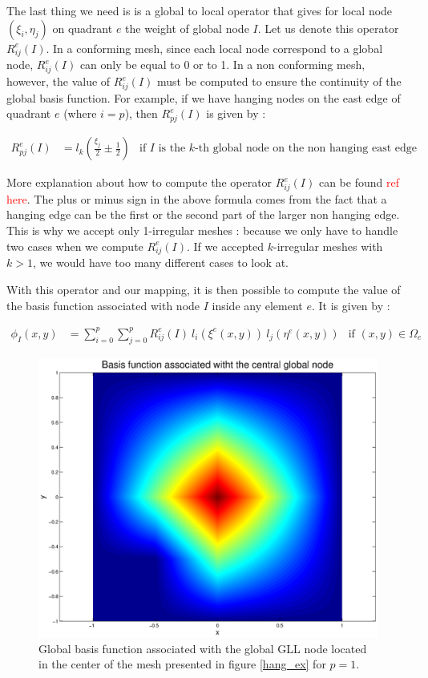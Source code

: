 The last thing we need is is a global to local operator that gives for local node $(\xi_i,\eta_j)$ on quadrant $e$ the weight of global node $I$. Let us denote this operator $R^e_{ij}(I)$. In a conforming mesh, since each local node correspond to a global node, $R^e_{ij}(I)$ can only be equal to 0 or to 1. In a non conforming mesh, however, the value of $R^e_{ij}(I)$ must be computed to ensure the continuity of the global basis function. For example, if we have hanging nodes on the east edge of quadrant $e$ (where $i=p$), then $R^e_{pj}(I)$ is given by : 

\begin{align*}
R^e_{pj}(I) &= l_k \left(\frac{\xi_j}{2}\pm \frac{1}{2}\right) &\text{if $I$ is the $k$-th global node on the non hanging east edge}
\end{align*} 

More explanation about how to compute the operator $R^e_{ij}(I)$ can be found \textcolor{red}{ref here}. The plus or minus sign in the above formula comes from the fact that a hanging edge can be the first or the second part of the larger non hanging edge. This is why we accept only 1-irregular meshes : because we only have to handle two cases when we compute $R^e_{ij}(I)$. If we accepted $k$-irregular meshes with $k>1$, we would have too many different cases to look at. 

With this operator and our mapping, it is then possible to compute the value of the basis function associated with node $I$ inside any element $e$. It is given by : 

\begin{align}
\phi_I(x,y) &= \sum_{i=0}^p\sum_{j=0}^p R^e_{ij}(I) \: l_i(\xi^e(x,y))\: l_j(\eta^e(x,y)) &\text{if $(x,y) \in \Omega_e$}\label{eq:global_basis}
\end{align}

\begin{figure}
\centering
\includegraphics[scale=0.35]{Theory/global_basis_func.eps}
\caption{Global basis function associated with the global GLL node located in the center of the mesh presented in figure \ref{hang_ex} for $p=1$.}
\label{global_basis_func}
\end{figure}


